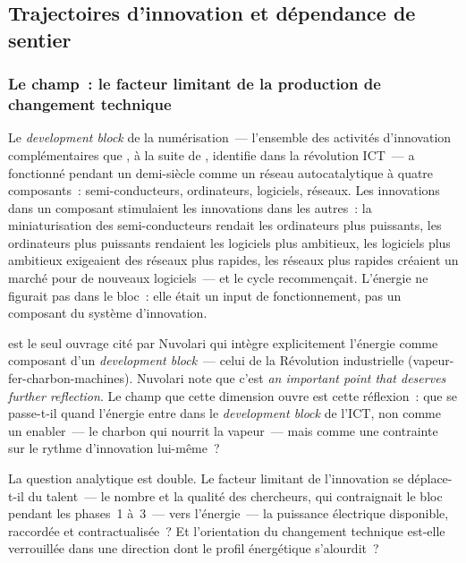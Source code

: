 \clearpage
\subsection{Trajectoires d'innovation et dépendance de sentier}\label{sec:d10-innovation}


\subsubsection{Le champ~: le facteur limitant de la production de changement technique}

\markEVO \markNEO \markSTS
Le \emph{development block} de la numérisation~--- l'ensemble des activités d'innovation complémentaires que \textcite{nuvolari_understanding_2019}, à la suite de \textcite{carlsson_development_1991}, identifie dans la révolution ICT~--- a fonctionné pendant un demi-siècle comme un réseau autocatalytique à quatre composants~: semi-conducteurs, ordinateurs, logiciels, réseaux. Les innovations dans un composant stimulaient les innovations dans les autres~: la miniaturisation des semi-conducteurs rendait les ordinateurs plus puissants, les ordinateurs plus puissants rendaient les logiciels plus ambitieux, les logiciels plus ambitieux exigeaient des réseaux plus rapides, les réseaux plus rapides créaient un marché pour de nouveaux logiciels~--- et le cycle recommençait. L'énergie ne figurait pas dans le bloc~: elle était un input de fonctionnement, pas un composant du système d'innovation.

\textcite{kander_power_2013} est le seul ouvrage cité par Nuvolari qui intègre explicitement l'énergie comme composant d'un \emph{development block}~--- celui de la Révolution industrielle (vapeur-fer-charbon-machines). Nuvolari note que c'est \og \emph{an important point that deserves further reflection}\fg{}. Le champ que cette dimension ouvre est cette réflexion~: que se passe-t-il quand l'énergie entre dans le \emph{development block} de l'ICT, non comme un enabler~--- le charbon qui nourrit la vapeur~--- mais comme une contrainte sur le rythme d'innovation lui-même~?

La question analytique est double. Le facteur limitant de l'innovation se déplace-t-il du talent~--- le nombre et la qualité des chercheurs, qui contraignait le bloc pendant les phases~1 à~3~--- vers l'énergie~--- la puissance électrique disponible, raccordée et contractualisée~? Et l'orientation du changement technique est-elle verrouillée dans une direction dont le profil énergétique s'alourdit~?

